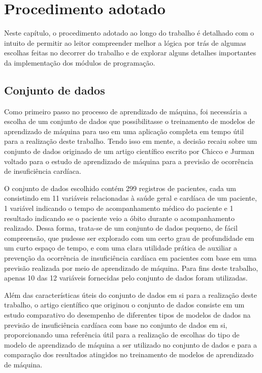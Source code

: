 \chapter{Procedimento adotado} \label{chap:procedimento_adotado}

Neste capítulo, o procedimento adotado ao longo do trabalho é detalhado com o intuito de permitir ao leitor compreender melhor a lógica por trás de algumas escolhas feitas no decorrer do trabalho e de explorar alguns detalhes importantes da implementação dos módulos de programação.

\section{Conjunto de dados}

Como primeiro passo no processo de aprendizado de máquina, foi necessária a escolha de um conjunto de dados que possibilitasse o treinamento de modelos de aprendizado de máquina para uso em uma aplicação completa em tempo útil para a realização deste trabalho. Tendo isso em mente, a decisão recaiu sobre um conjunto de dados\cite{larxel_dataset} originado de um artigo científico escrito por Chicco e Jurman\cite{chicco2020} voltado para o estudo de aprendizado de máquina para a previsão de ocorrência de insuficiência cardíaca.

O conjunto de dados escolhido contém 299 registros de pacientes, cada um consistindo em 11 variáveis relacionadas à saúde geral e cardíaca de um paciente, 1 variável indicando o tempo de acompanhamento médico do paciente e 1 resultado indicando se o paciente veio a óbito durante o acompanhamento realizado. Dessa forma, trata-se de um conjunto de dados pequeno, de fácil compreensão, que pudesse ser explorado com um certo grau de profundidade em um curto espaço de tempo, e com uma clara utilidade prática de auxiliar a prevenção da ocorrência de insuficiência cardíaca em pacientes com base em uma previsão realizada por meio de aprendizado de máquina. Para fins deste trabalho, apenas 10 das 12 variáveis fornecidas pelo conjunto de dados foram utilizadas.

Além das características úteis do conjunto de dados em si para a realização deste trabalho, o artigo científico que originou o conjunto de dados consiste em um estudo comparativo do desempenho de diferentes tipos de modelos de dados na previsão de insuficiência cardíaca com base no conjunto de dados em si, proporcionando uma referência útil para a realização de escolhas do tipo de modelo de aprendizado de máquina a ser utilizado no conjunto de dados e para a comparação dos resultados atingidos no treinamento de modelos de aprendizado de máquina.

